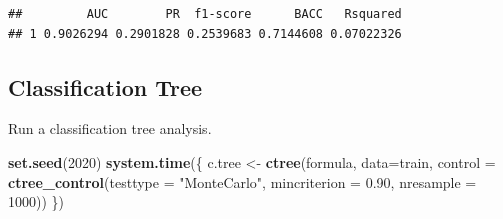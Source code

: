 \documentclass[]{article}
\newenvironment{Shaded}{\begin{snugshade}}{\end{snugshade}}
\newcommand{\DataTypeTok}[1]{\textcolor[rgb]{0.13,0.29,0.53}{#1}}
\newcommand{\DecValTok}[1]{\textcolor[rgb]{0.00,0.00,0.81}{#1}}
\newcommand{\FloatTok}[1]{\textcolor[rgb]{0.00,0.00,0.81}{#1}}
\newcommand{\KeywordTok}[1]{\textcolor[rgb]{0.13,0.29,0.53}{\textbf{#1}}}
\newcommand{\NormalTok}[1]{#1}
\newcommand{\OperatorTok}[1]{\textcolor[rgb]{0.81,0.36,0.00}{\textbf{#1}}}
\newcommand{\StringTok}[1]{\textcolor[rgb]{0.31,0.60,0.02}{#1}}
\begin{document}
\begin{Shaded}
\end{Shaded}

\begin{Shaded}
\end{Shaded}

\begin{verbatim}
##         AUC        PR  f1-score      BACC   Rsquared
## 1 0.9026294 0.2901828 0.2539683 0.7144608 0.07022326
\end{verbatim}

\hypertarget{classification-tree}{%
\subsection{Classification Tree}\label{classification-tree}}

Run a classification tree analysis.

\begin{Shaded}
\begin{Highlighting}[]
\KeywordTok{set.seed}\NormalTok{(}\DecValTok{2020}\NormalTok{)}
\KeywordTok{system.time}\NormalTok{(\{}
\NormalTok{c.tree <-}\StringTok{ }\KeywordTok{ctree}\NormalTok{(formula, }\DataTypeTok{data=}\NormalTok{train,}
               \DataTypeTok{control =} \KeywordTok{ctree_control}\NormalTok{(}\DataTypeTok{testtype =} \StringTok{"MonteCarlo"}\NormalTok{,}
               \DataTypeTok{mincriterion =} \FloatTok{0.90}\NormalTok{, }\DataTypeTok{nresample =} \DecValTok{1000}\NormalTok{))}
\NormalTok{\})}
\end{Highlighting}
\end{Shaded}
\end{document}
